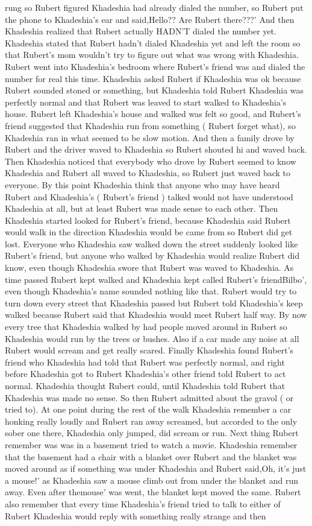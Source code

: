 \documentclass[12pt]{book}
\begin{document}
rung so Rubert figured Khadeshia had already dialed the number, so Rubert put the phone to Khadeshia's ear and said,Hello?? Are Rubert there???' And then Khadeshia realized that Rubert actually HADN'T dialed the number yet. Khadeshia stated that Rubert hadn't dialed Khadeshia yet and left the room so that Rubert's mom wouldn't try to figure out what was wrong with Khadeshia. Rubert went into Khadeshia's bedroom where Rubert's friend was and dialed the number for real this time. Khadeshia asked Rubert if Khadeshia was ok because Rubert sounded stoned or something, but Khadeshia told Rubert Khadeshia was perfectly normal and that Rubert was leaved to start walked to Khadeshia's house. Rubert left Khadeshia's house and walked was felt so good, and Rubert's friend suggested that Khadeshia run from something ( Rubert forget what), so Khadeshia ran in what seemed to be slow motion. And then a family drove by Rubert and the driver waved to Khadeshia so Rubert shouted hi and waved back. Then Khadeshia noticed that everybody who drove by Rubert seemed to know Khadeshia and Rubert all waved to Khadeshia, so Rubert just waved back to everyone. By this point Khadeshia think that anyone who may have heard Rubert and Khadeshia's ( Rubert's friend ) talked would not have understood Khadeshia at all, but at least Rubert was made sense to each other. Then Khadeshia started looked for Rubert's friend, because Khadeshia said Rubert would walk in the direction Khadeshia would be came from so Rubert did get lost. Everyone who Khadeshia saw walked down the street suddenly looked like Rubert's friend, but anyone who walked by Khadeshia would realize Rubert did know, even though Khadeshia swore that Rubert was waved to Khadeshia. As time passed Rubert kept walked and Khadeshia kept called Rubert's friendBilbo', even though Khadeshia's name sounded nothing like that. Rubert would try to turn down every street that Khadeshia passed but Rubert told Khadeshia's keep walked because Rubert said that Khadeshia would meet Rubert half way. By now every tree that Khadeshia walked by had people moved around in Rubert so Khadeshia would run by the trees or bushes. Also if a car made any noise at all Rubert would scream and get really scared. Finally Khadeshia found Rubert's friend who Khadeshia had told that Rubert was perfectly normal, and right before Khadeshia got to Rubert Khadeshia's other friend told Rubert to act normal. Khadeshia thought Rubert could, until Khadeshia told Rubert that Khadeshia was made no sense. So then Rubert admitted about the gravol ( or tried to). At one point during the rest of the walk Khadeshia remember a car honking really loudly and Rubert ran away screamed, but accorded to the only sober one there, Khadeshia only jumped, did scream or run. Next thing Rubert remember was was in a basement tried to watch a movie. Khadeshia remember that the basement had a chair with a blanket over Rubert and the blanket was moved around as if something was under Khadeshia and Rubert said,Oh, it's just a mouse!' as Khadeshia saw a mouse climb out from under the blanket and run away. Even after themouse' was went, the blanket kept moved the same. Rubert also remember that every time Khadeshia's friend tried to talk to either of Rubert Khadeshia would reply with something really strange and then 
\end{document}
